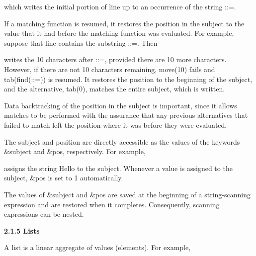 \noindent which writes the initial portion of line up to an occurrence
of the string {\textquotedbl}::={\textquotedbl}.

If a matching function is resumed, it restores the position in the
subject to the value that it had before the matching function was
evaluated. For example, suppose that line contains the substring
{\textquotedbl}::={\textquotedbl}. Then



\noindent writes the 10 characters after
{\textquotedbl}::={\textquotedbl}, provided there are 10 more
characters. However, if there are not 10 characters remaining,
move(10) fails and tab(find({\textquotedbl}::={\textquotedbl})) is
resumed. It restores the position to the beginning of the subject, and
the alternative, tab(0), matches the entire subject, which is written.

Data backtracking of the position in the subject is important, since
it allows matches to be performed with the assurance that any previous
alternatives that failed to match left the position where it was
before they were evaluated.

The subject and position are directly accessible as the values of the
keywords \&subject and \&pos, respectively. For example,



\noindent assigns the string {\textquotedbl}Hello{\textquotedbl} to
the subject. Whenever a value is assigned to the subject, \&pos is set
to 1 automatically.

The values of \&subject and \&pos are saved at the beginning of a
string-scanning expression and are restored when it
completes. Consequently, scanning expressions can be nested.

{\sffamily\bfseries
2.1.5 Lists}


A list is a linear aggregate of values
({\textquotedbl}elements{\textquotedbl}). For example,



